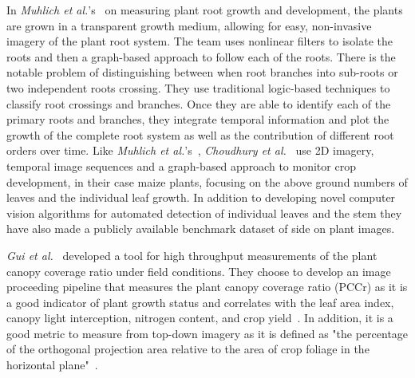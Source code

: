 In \textit{Muhlich et al.}'s~\cite{muhlichMeasuringPlantRoot2008} on measuring plant root growth and development, the plants are grown in a transparent growth medium, allowing for easy, non-invasive imagery of the plant root system.
The team uses nonlinear filters to isolate the roots and then a graph-based approach to follow each of the roots.
There is the notable problem of distinguishing between when root branches into sub-roots or two independent roots crossing.
They use traditional logic-based techniques to classify root crossings and branches.
Once they are able to identify each of the primary roots and branches, they integrate temporal information and plot the growth of the complete root system as well as the contribution of different root orders over time.
Like \textit{Muhlich et al.}'s~\cite{muhlichMeasuringPlantRoot2008}, \textit{Choudhury et al.}~\cite{daschoudhuryHolisticComponentPlant2018} use 2D imagery, temporal image sequences and a graph-based approach to monitor crop development, in their case maize plants, focusing on the above ground numbers of leaves and the individual leaf growth.
In addition to developing novel computer vision algorithms for automated detection of individual leaves and the stem they have also made a publicly available benchmark dataset of side on plant images.

\textit{Gui et al.}~\cite{guoEasyPCCBenchmarkDatasets2017} developed a tool for high throughput measurements of the plant canopy coverage ratio under field conditions.
They choose to develop an image proceeding pipeline that measures the plant canopy coverage ratio (PCCr) as it is a good indicator of plant growth status and correlates with the leaf area index, canopy light interception, nitrogen content, and crop yield~\cite{campilloUsingDigitalImages2008, casadesusUsingVegetationIndices2007}.
In addition, it is a good metric to measure from top-down imagery as it is deﬁned as "the percentage of the orthogonal projection area relative to the area of crop foliage in the horizontal plane"~\cite{guoEasyPCCBenchmarkDatasets2017}.

